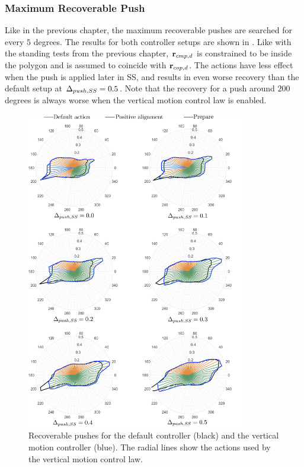 \subsubsection{Maximum Recoverable Push}
Like in the previous chapter,  the maximum recoverable pushes are searched for every $5$ degrees. The results for both controller setups are shown in . Like with the standing tests from the previous chapter, $\mathbf{r}_{cmp,d}$ is constrained to be inside the polygon and is assumed to coincide with $\mathbf{r}_{cop,d}$. The actions have less effect when the push is applied later in \ac{SS}, and results in even worse recovery than the default setup at $\Delta_{push,SS}=0.5$. Note that the recovery for a push around $200$ degrees is always worse when the vertical motion control law is enabled.
\begin{figure}
     \centering
        \includegraphics[width=0.85\textwidth]{STYLESTUFF/rounActions.png}
    \caption{Recoverable pushes for the default controller (black) and the vertical motion controller (blue). The radial lines show the actions used by the vertical motion control law.}
    \label{fig:roundPushActions}
\end{figure}

